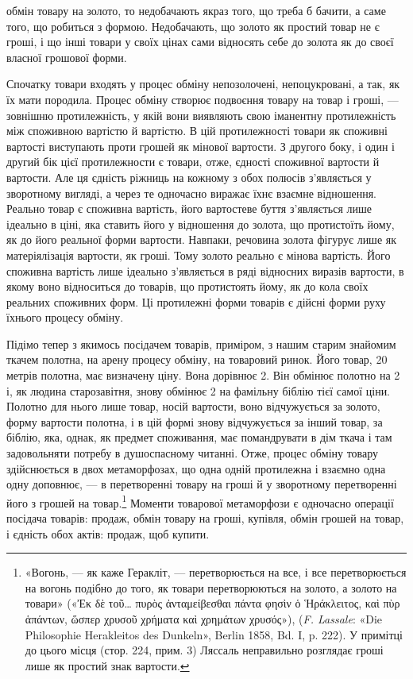 \parcont{}  %
обмін товару на золото, то недобачають якраз того, що треба б
бачити, а саме того, що робиться з формою. Недобачають, що золото
як простий товар не є гроші, і що інші товари у своїх цінах
сами відносять себе до золота як до своєї власної грошової
форми.

Спочатку товари входять у процес обміну непозолочені, непоцукровані,
а так, як їх мати породила. Процес обміну створює
подвоєння товару на товар і гроші, — зовнішню протилежність,
у якій вони виявляють свою іманентну протилежність між споживною
вартістю й вартістю. В цій протилежності товари як
споживні вартості виступають проти грошей як мінової вартости.
З другого боку, і один і другий бік цієї протилежности
є товари, отже, єдності споживної вартости й вартости. Але ця
єдність ріжниць на кожному з обох полюсів з’являється у зворотному
вигляді, а через те одночасно виражає їхнє взаємне відношення.
Реально товар є споживна вартість, його вартостеве
буття з’являється лише ідеально в ціні, яка ставить його у відношення
до золота, що протистоїть йому, як до його реальної
форми вартости. Навпаки, речовина золота фігурує лише як матеріялізація
вартости, як гроші. Тому золото реально є мінова
вартість. Його споживна вартість лише ідеально з’являється в
ряді відносних виразів вартости, в якому воно відноситься до
товарів, що протистоять йому, як до кола своїх реальних споживних
форм. Ці протилежні форми товарів є дійсні форми руху
їхнього процесу обміну.

Підімо тепер з якимось посідачем товарів, приміром, з нашим
старим знайомим ткачем полотна, на арену процесу обміну, на
товаровий ринок. Його товар, 20 метрів полотна, має визначену
ціну. Вона дорівнює 2. Він обмінює полотно
на 2 і, як людина старозавітня, знову обмінює
2 на фамільну біблію тієї самої ціни. Полотно
для нього лише товар, носій вартости, воно відчужується за
золото, форму вартости полотна, і в цій формі знову відчужується
за інший товар, за біблію, яка, однак, як предмет споживання,
має помандрувати в дім ткача і там задовольняти потребу
в душоспасному читанні. Отже, процес обміну товару здійснюється
в двох метаморфозах, що одна одній протилежна і взаємно
одна одну доповнює, — в перетворенні товару на гроші й у зворотному
перетворенні його з грошей на товар.\footnote{
«Вогонь, — як каже Геракліт, — перетворюється на все, і все
перетворюється на вогонь подібно до того, як товари перетворюються на
золото, а золото на товари» («\textgreek{Ἐκ δὲ τοῦ\dots{} πυρὸς ἀνταμείβεσθαι πάντα φησὶν ὁ Ἡράκλειτος, καὶ πὺρ
ἁπάντων, ὥσπερ χρυσοῦ χρήματα καὶ χρημάτων χρυσός}»), (\emph{F. Lassale}:
«Die Philosophie Herakleitos des Dunkeln», Berlin 1858, Bd. I, p. 222).
У примітці до цього місця (стор. 224, прим. 3) Ляссаль неправильно розглядає
гроші лише як простий знак вартости.
} Моменти товарової
метаморфози є одночасно операції посідача товарів: продаж,
обмін товару на гроші, купівля, обмін грошей на товар,
і єдність обох актів: продаж, щоб купити.
